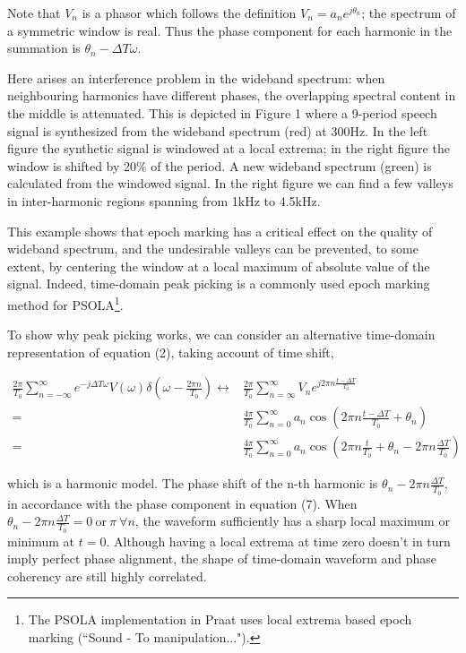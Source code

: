 \documentclass{article}
\begin{document}
Note that $V_n$ is a phasor which follows the definition $V_n = a_n e^{j\theta_n}$; the spectrum of a symmetric window is real. Thus the phase component for each harmonic in the summation is $\theta_n - \Delta T \omega$.

Here arises an interference problem in the wideband spectrum: when neighbouring harmonics have different phases, the overlapping spectral content in the middle is attenuated. This is depicted in Figure 1 where a 9-period speech signal is synthesized from the wideband spectrum (red) at 300Hz. In the left figure the synthetic signal is windowed at a local extrema; in the right figure the window is shifted by 20\% of the period. A new wideband spectrum (green) is calculated from the windowed signal. In the right figure we can find a few valleys in inter-harmonic regions spanning from 1kHz to 4.5kHz.

This example shows that epoch marking has a critical effect on the quality of wideband spectrum, and the undesirable valleys can be prevented, to some extent, by centering the window at a local maximum of absolute value of the signal. Indeed, time-domain peak picking is a commonly used epoch marking method for PSOLA\footnote{The PSOLA implementation in Praat uses local extrema based epoch marking (``Sound - To manipulation...").}.

\begin{figure}[H]
\centering
\scalebox{.65}{}
\scalebox{.65}{}
\caption{}
\label{fig:psola-wb}
\end{figure}

To show why peak picking works, we can consider an alternative time-domain representation of equation (2), taking account of time shift,

\begin{align}
\frac{2\pi}{T_0} \sum_{n=-\infty}^{\infty} e^{-j \Delta T \omega} V(\omega) \delta(\omega - \frac{2\pi n}{T_0}) \leftrightarrow& \frac{2\pi}{T_0} \sum_{n=\infty}^{\infty} V_n e^{j 2\pi n \frac{t - \Delta T}{T_0}} \\
 =& \frac{4\pi}{T_0} \sum_{n=0}^{\infty} a_n \cos(2\pi n \frac{t - \Delta T}{T_0} + \theta_n) \\
 =& \frac{4\pi}{T_0} \sum_{n=0}^{\infty} a_n \cos(2\pi n \frac{t}{T_0} + \theta_n - 2\pi n \frac{\Delta T}{T_0}) 
\end{align}

which is a harmonic model. The phase shift of the n-th harmonic is $\theta_n - 2\pi n \frac{\Delta T}{T_0}$, in accordance with the phase component in equation (7). When $\theta_n - 2\pi n \frac{\Delta T}{T_0} = 0 \ \textrm{or} \ \pi \ \forall n$, the waveform sufficiently has a sharp local maximum or minimum at $t = 0$. Although having a local extrema at time zero doesn't in turn imply perfect phase alignment, the shape of time-domain waveform and phase coherency are still highly correlated.
\end{document}
